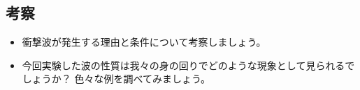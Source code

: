 \newpage




\subsection*{考察}

\begin{itemize}

%

\item 衝撃波が発生する理由と条件について考察しましょう。

\vspace{6cm}

\item 今回実験した波の性質は我々の身の回りでどのような現象として見られるでしょうか？ 色々な例を調べてみましょう。

\end{itemize}

